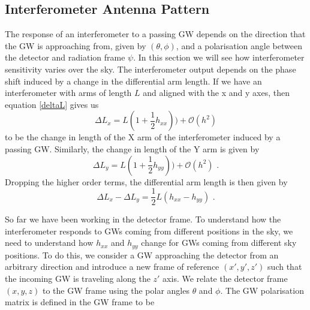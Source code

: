 \documentclass[11pt]{cuthesis}
\newcommand{\fs}{\text{ .}}
\begin{document}
\subsection{Interferometer Antenna Pattern} \label{sec:antenna pattern}
The response of an interferometer to a passing GW depends on the direction that the GW is approaching from, given by $(\theta,\phi)$, and a polarisation angle between the detector and radiation frame $\psi$. In this section we will see how interferometer sensitivity varies over the sky.\cite{maggiore} The interferometer output depends on the phase shift induced by a change in the differential arm length. If we have an interferometer with arms of length $L$ and aligned with the x and y axes, then equation \ref{deltaL} gives us
\begin{equation}
\Delta L_x = L (1 + \frac{1}{2}h_{xx})) + \mathcal{O}(h^2)
\end{equation} 
to be the change in length of the X arm of the interferometer induced by a passing GW. Similarly, the change in length of the Y arm is given by
\begin{equation}
\Delta L_y = L (1 + \frac{1}{2}h_{yy}))  + \mathcal{O}(h^2) \fs
\end{equation} 
Dropping the higher order terms, the differential arm length is then given by
\begin{equation} \label{darm eqn}
\Delta L_x - \Delta L_y = \frac{1}{2} L(h_{xx} - h_{yy}) \fs
\end{equation}

So far we have been working in the detector frame. To understand how the interferometer responds to GWs coming from different positions in the sky, we need to understand how $h_{xx}$ and $h_{yy}$ change for GWs coming from different sky positions. To do this, we consider a GW approaching the detector from an arbitrary direction and introduce a new frame of reference $(x',y',z')$ such that the incoming GW is traveling along the $z'$ axis. We relate the detector frame $(x,y,z)$ to the GW frame using the polar angles $\theta$ and $\phi$. The GW polarisation matrix is defined in the GW frame to be
\end{document}
